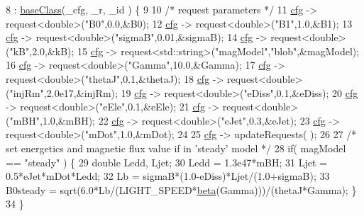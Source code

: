 \begin{DoxyCode}
8                                                                           : 
      \hyperlink{classbaseClass}{baseClass}(\_cfg, \_r, \_id ) \{ 
9 
10   \textcolor{comment}{/* request parameters */}
11   \hyperlink{classbaseClass_a744f87a6ebe63da08256c022d42a4ca7}{cfg} -> request<double>(\textcolor{stringliteral}{"B0"},0.0,&B0);
12   \hyperlink{classbaseClass_a744f87a6ebe63da08256c022d42a4ca7}{cfg} -> request<double>(\textcolor{stringliteral}{"B1"},1.0,&B1);
13   \hyperlink{classbaseClass_a744f87a6ebe63da08256c022d42a4ca7}{cfg} -> request<double>(\textcolor{stringliteral}{"sigmaB"},0.01,&sigmaB);
14   \hyperlink{classbaseClass_a744f87a6ebe63da08256c022d42a4ca7}{cfg} -> request<double>(\textcolor{stringliteral}{"kB"},2.0,&kB);
15   \hyperlink{classbaseClass_a744f87a6ebe63da08256c022d42a4ca7}{cfg} -> request<std::string>(\textcolor{stringliteral}{"magModel"},\textcolor{stringliteral}{"blob"},&magModel);
16   \hyperlink{classbaseClass_a744f87a6ebe63da08256c022d42a4ca7}{cfg} -> request<double>(\textcolor{stringliteral}{"Gamma"},10.0,&Gamma);
17   \hyperlink{classbaseClass_a744f87a6ebe63da08256c022d42a4ca7}{cfg} -> request<double>(\textcolor{stringliteral}{"thetaJ"},0.1,&thetaJ);
18   \hyperlink{classbaseClass_a744f87a6ebe63da08256c022d42a4ca7}{cfg} -> request<double>(\textcolor{stringliteral}{"injRm"},2.0e17,&injRm);
19   \hyperlink{classbaseClass_a744f87a6ebe63da08256c022d42a4ca7}{cfg} -> request<double>(\textcolor{stringliteral}{"eDiss"},0.1,&eDiss);
20   \hyperlink{classbaseClass_a744f87a6ebe63da08256c022d42a4ca7}{cfg} -> request<double>(\textcolor{stringliteral}{"eEle"},0.1,&eEle);
21   \hyperlink{classbaseClass_a744f87a6ebe63da08256c022d42a4ca7}{cfg} -> request<double>(\textcolor{stringliteral}{"mBH"},1.0,&mBH);
22   \hyperlink{classbaseClass_a744f87a6ebe63da08256c022d42a4ca7}{cfg} -> request<double>(\textcolor{stringliteral}{"eJet"},0.3,&eJet);
23   \hyperlink{classbaseClass_a744f87a6ebe63da08256c022d42a4ca7}{cfg} -> request<double>(\textcolor{stringliteral}{"mDot"},1.0,&mDot);
24 
25   \hyperlink{classbaseClass_a744f87a6ebe63da08256c022d42a4ca7}{cfg} -> updateRequests( );
26 
27   \textcolor{comment}{/* set energetics and magnetic flux value if in 'steady' model */}
28   \textcolor{keywordflow}{if}( magModel == \textcolor{stringliteral}{"steady"} ) \{
29     \textcolor{keywordtype}{double} Ledd, Ljet;
30     Ledd = 1.3e47*mBH;
31     Ljet = 0.5*eJet*mDot*Ledd;
32     Lb = sigmaB*(1.0-eDiss)*Ljet/(1.0+sigmaB);
33     B0steady = sqrt(6.0*Lb/(LIGHT\_SPEED*\hyperlink{classbaseClass_a208facecf3a4480b47bebfce91413a39}{beta}(Gamma)))/(thetaJ*Gamma); \}
34 \}
\end{DoxyCode}
